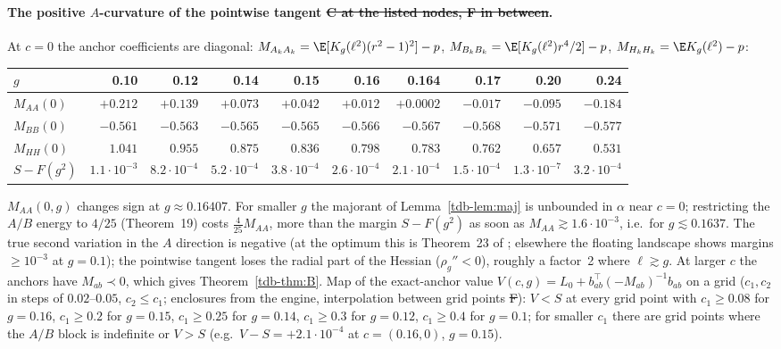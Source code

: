 \paragraph{The positive $A$-curvature of the pointwise tangent \st{C at the listed nodes, F in between}.}
At $c=0$ the anchor coefficients are diagonal: $M_{A_kA_k}=\E[K_g(\ell^2)(r^2-1)^2]-p$, $M_{B_kB_k}=\E[K_g(\ell^2)r^4/2]-p$, $M_{H_kH_k}=\E K_g(\ell^2)-p$:
\begin{center}\small
\begin{tabular}{lrrrrrrrrr}\toprule
$g$ & 0.10 & 0.12 & 0.14 & 0.15 & 0.16 & 0.164 & 0.17 & 0.20 & 0.24\\\midrule
$M_{AA}(0)$ & $+0.212$ & $+0.139$ & $+0.073$ & $+0.042$ & $+0.012$ & $+0.0002$ & $-0.017$ & $-0.095$ & $-0.184$\\
$M_{BB}(0)$ & $-0.561$ & $-0.563$ & $-0.565$ & $-0.565$ & $-0.566$ & $-0.567$ & $-0.568$ & $-0.571$ & $-0.577$\\
$M_{HH}(0)$ & $1.041$ & $0.955$ & $0.875$ & $0.836$ & $0.798$ & $0.783$ & $0.762$ & $0.657$ & $0.531$\\
$S-F(g^2)$ & $1.1\!\cdot\!10^{-3}$ & $8.2\!\cdot\!10^{-4}$ & $5.2\!\cdot\!10^{-4}$ & $3.8\!\cdot\!10^{-4}$ & $2.6\!\cdot\!10^{-4}$ & $2.1\!\cdot\!10^{-4}$ & $1.5\!\cdot\!10^{-4}$ & $1.3\!\cdot\!10^{-7}$ & $3.2\!\cdot\!10^{-4}$\\\bottomrule
\end{tabular}
\end{center}
$M_{AA}(0,g)$ changes sign at $g\approx0.16407$. For smaller $g$ the majorant of Lemma~\ref{tdb-lem:maj} is unbounded in $\alpha$ near $c=0$; restricting the
$A/B$ energy to $4/25$ (Theorem~19) costs $\frac{4}{25}M_{AA}$, more than the margin $S-F(g^2)$ as soon as $M_{AA}\gtrsim1.6\cdot10^{-3}$, i.e.\ for
$g\lesssim0.1637$. The true second variation in the $A$ direction is negative (at the optimum this is Theorem~23 of \Sd; elsewhere the floating landscape
shows margins $\ge10^{-3}$ at $g=0.1$); the pointwise tangent loses the radial part of the Hessian ($\rho_g''<0$), roughly a factor~2 where
$\ell\gtrsim g$. At larger $c$ the anchors have $M_{ab}\prec0$, which gives Theorem~\ref{tdb-thm:B}.
Map of the exact-anchor value $V(c,g)=L_0+b_{ab}^\top(-M_{ab})^{-1}b_{ab}$ on a grid ($c_1,c_2$ in steps of $0.02$--$0.05$, $c_2\le c_1$;
enclosures from the engine, interpolation between grid points \st{F}): $V<S$ at every grid point with $c_1\ge0.08$ for $g=0.16$, $c_1\ge0.2$ for
$g=0.15$, $c_1\ge0.25$ for $g=0.14$, $c_1\ge0.3$ for $g=0.12$, $c_1\ge0.4$ for $g=0.1$; for smaller $c_1$ there are grid points where the $A/B$ block
is indefinite or $V>S$ (e.g.\ $V-S=+2.1\cdot10^{-4}$ at $c=(0.16,0)$, $g=0.15$).

